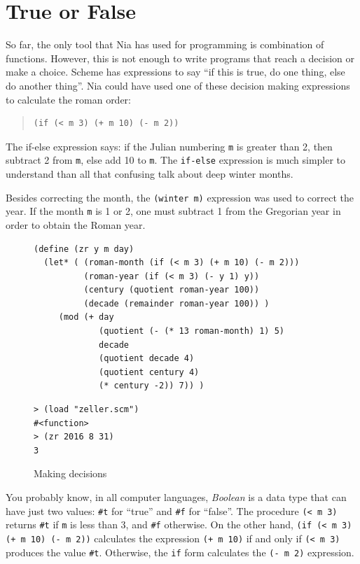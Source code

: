 \documentclass[a4paper,12pt]{book}
\newenvironment{fmpage}[1]
               {\begin{lrbox}{\fmbox}\begin{minipage}{#1}}
               {\end{minipage}\end{lrbox}\fbox{\usebox{\fmbox}}}
\begin{document}
\section{True or False}
So far, the only tool that Nia has used
for programming is combination of functions.
However, this is not enough to write
programs that reach a decision or
make a choice. Scheme has expressions
to say ``if this is true, do one thing,
else do another thing''. Nia 
could have used one of these decision
making expressions to calculate the roman
order:
\begin{quote}
\begin{verbatim}
(if (< m 3) (+ m 10) (- m 2))
\end{verbatim}
\end{quote}
The if-else expression says: if the
Julian numbering \verb|m| is greater
than 2, then subtract 2 from \verb|m|,
else add 10 to \verb|m|. The \verb|if-else|
expression is much simpler to understand
than all that confusing talk about deep
winter months.

Besides correcting the month, the \verb|(winter m)|
expression was used to correct the year. If
the month \verb|m| is 1 or 2, one must subtract
1 from the Gregorian year in order to obtain
the Roman year.

\begin{figure}[!b]
\begin{fmpage}{0.9\linewidth}
\begin{verbatim}
(define (zr y m day)
  (let* ( (roman-month (if (< m 3) (+ m 10) (- m 2)))
          (roman-year (if (< m 3) (- y 1) y))
          (century (quotient roman-year 100))
          (decade (remainder roman-year 100)) )
     (mod (+ day
             (quotient (- (* 13 roman-month) 1) 5)
             decade
             (quotient decade 4)
             (quotient century 4)
             (* century -2)) 7)) )
\end{verbatim}
\end{fmpage}

\begin{fmpage}{0.9\linewidth}
\begin{verbatim}
> (load "zeller.scm")
#<function>
> (zr 2016 8 31)
3
\end{verbatim}
\end{fmpage}
\caption{Making decisions}
\label{fig:zeller}
\end{figure}

You probably know, in all computer
languages, {\em Boolean} is a data type
that can have just two values: \verb|#t|
for ``true'' and \verb|#f| for ``false''.
The procedure \verb|(< m 3)| returns
\verb|#t| if \verb|m| is less than 3,
and \verb|#f| otherwise. On the other
hand, \verb|(if (< m 3) (+ m 10) (- m 2))|
calculates the expression \verb|(+ m 10)|
if and only if \verb|(< m 3)| produces
the value \verb|#t|. Otherwise, the
\verb|if| form calculates the \verb|(- m 2)|
expression.
\end{document}

